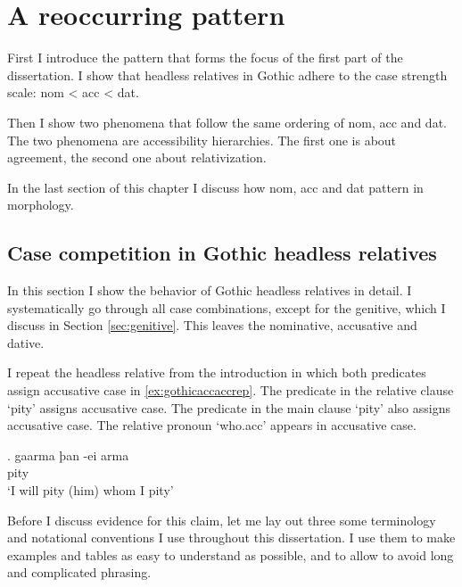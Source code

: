 
\chapter{A reoccurring pattern}

First I introduce the pattern that forms the focus of the first part of the dissertation. I show that headless relatives in Gothic adhere to the case strength scale: \ac{nom} < \ac{acc} < \ac{dat}.

Then I show two phenomena that follow the same ordering of \ac{nom}, \ac{acc} and \ac{dat}. The two phenomena are accessibility hierarchies. The first one is about agreement, the second one about relativization.

In the last section of this chapter I discuss how \ac{nom}, \ac{acc} and \ac{dat} pattern in morphology.


\section{Case competition in Gothic headless relatives}

In this section I show the behavior of Gothic headless relatives in detail. I systematically go through all case combinations, except for the genitive, which I discuss in Section \ref{sec:genitive}. This leaves the nominative, accusative and dative.




I repeat the headless relative from the introduction in which both predicates assign accusative case in \ref{ex:gothicaccaccrep}. The predicate in the relative clause  `pity' assigns accusative case. The predicate in the main clause  `pity' also assigns accusative case. The relative pronoun  `who.\ac{acc}' appears in accusative case.

\exg. gaarma þan -ei arma\\
 pity\scsub{[acc]}   \\
 `I will pity (him) whom I pity' \label{ex:gothicaccaccrep}





 Before I discuss evidence for this claim, let me lay out three some terminology and notational conventions I use throughout this dissertation. I use them to make examples and tables as easy to understand as possible, and to allow to avoid long and complicated phrasing.

